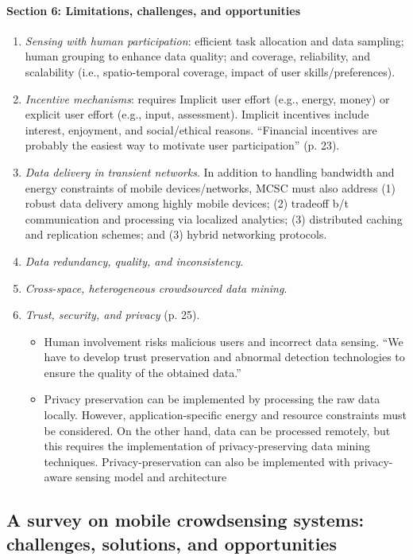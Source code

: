 \paragraph{Section 6: Limitations, challenges, and opportunities}
	\begin{enumerate}
	\item \emph{Sensing with human participation}: efficient task allocation and data sampling; human grouping to enhance data quality; and coverage, reliability, and scalability (i.e., spatio-temporal coverage, impact of user skills/preferences).
	\item \emph{Incentive mechanisms}: requires Implicit user effort (e.g., energy, money) or explicit user effort (e.g., input, assessment). Implicit incentives include interest, enjoyment, and social/ethical reasons. ``Financial incentives are probably the easiest way to motivate user participation'' (p. 23).
	\item \emph{Data delivery in transient networks}. In addition to handling bandwidth and energy constraints of mobile devices/networks, MCSC must also address (1) robust data delivery among highly mobile devices; (2) tradeoff b/t communication and processing via localized analytics; (3) distributed caching and replication schemes; and (3) hybrid networking protocols.
	\item \emph{Data redundancy, quality, and inconsistency}.
	\item \emph{Cross-space, heterogeneous crowdsourced data mining}.
	\item \emph{Trust, security, and privacy} (p. 25).
		\begin{itemize}
		\item Human involvement risks malicious users and incorrect data sensing. ``We have to develop trust preservation and abnormal detection technologies to ensure the quality of the obtained data.''
		\item Privacy preservation can be implemented by processing the raw data locally. However, application-specific energy and resource constraints must be considered. On the other hand, data can be processed remotely, but this requires the implementation of privacy-preserving data mining techniques. Privacy-preservation can also be implemented with privacy-aware sensing model and architecture
		\end{itemize}
	\end{enumerate}

\subsection{A survey on mobile crowdsensing systems: challenges, solutions, and opportunities}

